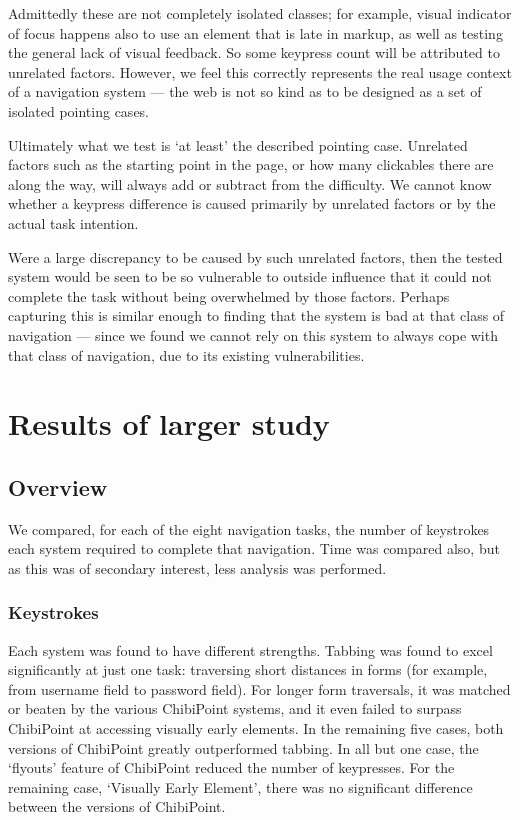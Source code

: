 \documentclass[a4paper, 12pt]{report}
\begin{document}
Admittedly these are not completely isolated classes; for example, visual indicator of focus happens also to use an element that is late in markup, as well as testing the general lack of visual feedback. So some keypress count will be attributed to unrelated factors. However, we feel this correctly represents the real usage context of a navigation system --- the web is not so kind as to be designed as a set of isolated pointing cases.

Ultimately what we test is `at least' the described pointing case. Unrelated factors such as the starting point in the page, or how many clickables there are along the way, will always add or subtract from the difficulty. We cannot know whether a keypress difference is caused primarily by unrelated factors or by the actual task intention.

Were a large discrepancy to be caused by such unrelated factors, then the tested system would be seen to be so vulnerable to outside influence that it could not complete the task without being overwhelmed by those factors. Perhaps capturing this is similar enough to finding that the system is bad at that class of navigation --- since we found we cannot rely on this system to always cope with that class of navigation, due to its existing vulnerabilities.

\chapter{Results of larger study}
\section{Overview}
We compared, for each of the eight navigation tasks, the number of keystrokes each system required to complete that navigation. Time was compared also, but as this was of secondary interest, less analysis was performed.
\subsection{Keystrokes}
Each system was found to have different strengths. Tabbing was found to excel significantly at just one task: traversing short distances in forms (for example, from username field to password field). For longer form traversals, it was matched or beaten by the various ChibiPoint systems, and it even failed to surpass ChibiPoint at accessing visually early elements.
In the remaining five cases, both versions of ChibiPoint greatly outperformed tabbing. In all but one case, the `flyouts' feature of ChibiPoint reduced the number of keypresses. For the remaining case, `Visually Early Element', there was no significant difference between the versions of ChibiPoint.
\end{document}
